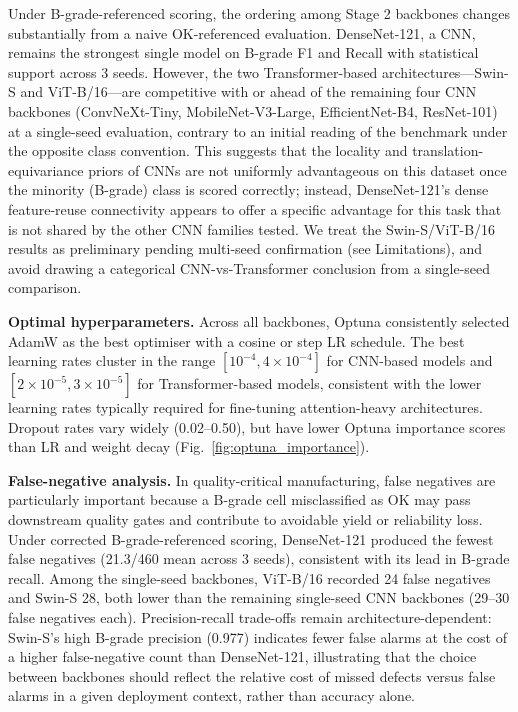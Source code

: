 \documentclass[conference]{IEEEtran}
\begin{document}
Under B-grade-referenced scoring, the ordering among Stage 2 backbones changes substantially from a naive OK-referenced evaluation. DenseNet-121, a CNN, remains the strongest single model on B-grade F1 and Recall with statistical support across 3 seeds. However, the two Transformer-based architectures---Swin-S and ViT-B/16---are competitive with or ahead of the remaining four CNN backbones (ConvNeXt-Tiny, MobileNet-V3-Large, EfficientNet-B4, ResNet-101) at a single-seed evaluation, contrary to an initial reading of the benchmark under the opposite class convention. This suggests that the locality and translation-equivariance priors of CNNs are not uniformly advantageous on this dataset once the minority (B-grade) class is scored correctly; instead, DenseNet-121's dense feature-reuse connectivity appears to offer a specific advantage for this task that is not shared by the other CNN families tested. We treat the Swin-S/ViT-B/16 results as preliminary pending multi-seed confirmation (see Limitations), and avoid drawing a categorical CNN-vs-Transformer conclusion from a single-seed comparison.

\textbf{Optimal hyperparameters.} Across all backbones, Optuna consistently selected AdamW as the best optimiser with a cosine or step LR schedule. The best learning rates cluster in the range $[10^{-4}, 4×10^{-4}]$ for CNN-based models and $[2×10^{-5}, 3×10^{-5}]$ for Transformer-based models, consistent with the lower learning rates typically required for fine-tuning attention-heavy architectures. Dropout rates vary widely (0.02--0.50), but have lower Optuna importance scores than LR and weight decay (Fig.~\ref{fig:optuna_importance}).

\textbf{False-negative analysis.} In quality-critical manufacturing, false negatives are particularly important because a B-grade cell misclassified as OK may pass downstream quality gates and contribute to avoidable yield or reliability loss. Under corrected B-grade-referenced scoring, DenseNet-121 produced the fewest false negatives (21.3/460 mean across 3 seeds), consistent with its lead in B-grade recall. Among the single-seed backbones, ViT-B/16 recorded 24 false negatives and Swin-S 28, both lower than the remaining single-seed CNN backbones (29--30 false negatives each). Precision-recall trade-offs remain architecture-dependent: Swin-S's high B-grade precision (0.977) indicates fewer false alarms at the cost of a higher false-negative count than DenseNet-121, illustrating that the choice between backbones should reflect the relative cost of missed defects versus false alarms in a given deployment context, rather than accuracy alone.
\end{document}
